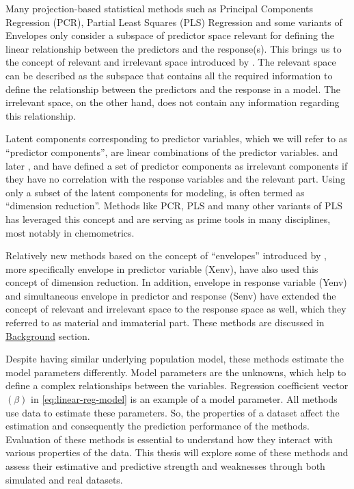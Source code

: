 \documentclass[11pt,twoside,openright,titlepage,
  headinclude,footinclude,BCOR=5mm,
  numbers=noenddot,cleardoublepage=empty,
  tablecaptionabove, dottedtoc,
  bibliography=totoc,paper=a4]{scrreprt}
\begin{document}
Many projection-based statistical methods such as Principal Components Regression (PCR), Partial Least Squares (PLS) Regression and some variants of Envelopes only consider a subspace of predictor space relevant for defining the linear relationship between the predictors and the response(s). This brings us to the concept of relevant and irrelevant space introduced by \citet{Naes1985}. The relevant space can be described as the subspace that contains all the required information to define the relationship between the predictors and the response in a model. The irrelevant space, on the other hand, does not contain any information regarding this relationship.

Latent components corresponding to predictor variables, which we will refer to as ``predictor components'', are linear combinations of the predictor variables. \citet{Naes1985} and later \citet{helland1990partial}, \citet{naes1993relevant} and \citet{Helland1994b} have defined a set of predictor components as irrelevant components if they have no correlation with the response variables and the relevant part. Using only a subset of the latent components for modeling, is often termed as ``dimension reduction''. Methods like PCR, PLS and many other variants of PLS has leveraged this concept and are serving as prime tools in many disciplines, most notably in chemometrics.

Relatively new methods based on the concept of ``envelopes'' introduced by \citet{Cook2007a}, more specifically envelope in predictor variable (Xenv), have also used this concept of dimension reduction. In addition, envelope in response variable (Yenv) and simultaneous envelope in predictor and response (Senv) have extended the concept of relevant and irrelevant space to the response space as well, which they referred to as material and immaterial part. These methods are discussed in \protect\hyperlink{background}{Background} section.

Despite having similar underlying population model, these methods estimate the model parameters differently. Model parameters are the unknowns, which help to define a complex relationships between the variables. Regression coefficient vector \((\beta)\) in \eqref{eq:linear-reg-model} is an example of a model parameter. All methods use data to estimate these parameters. So, the properties of a dataset affect the estimation and consequently the prediction performance of the methods. Evaluation of these methods is essential to understand how they interact with various properties of the data. This thesis will explore some of these methods and assess their estimative and predictive strength and weaknesses through both simulated and real datasets.
\end{document}
